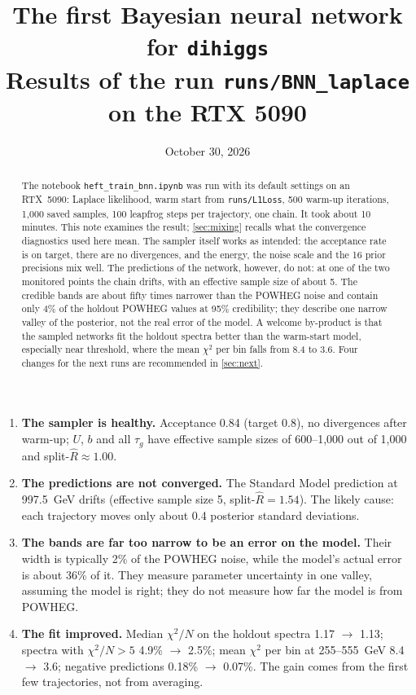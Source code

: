 \documentclass[11pt]{article}
\title{\textbf{The first Bayesian neural network for \texttt{dihiggs}}\\[4pt]
\large Results of the run \texttt{runs/BNN\_laplace} on the RTX 5090}
\date{October 30, 2026}
\newcommand{\file}[1]{\nolinkurl{#1}}
\begin{document}
\maketitle

\begin{abstract}
\noindent
The notebook \file{heft_train_bnn.ipynb} was run with its default settings on an
RTX~5090: Laplace likelihood, warm start from \file{runs/L1Loss}, 500 warm-up
iterations, 1,000 saved samples, 100 leapfrog steps per trajectory, one chain. It took
about 10 minutes. This note examines the result; \cref{sec:mixing} recalls what the convergence
diagnostics used here mean. The sampler itself works as intended:
the acceptance rate is on target, there are no divergences, and the energy, the noise
scale and the 16 prior precisions mix well. The predictions of the network, however,
do not: at one of the two monitored points the chain drifts, with an effective sample
size of about 5. The credible bands are about fifty times narrower than the POWHEG
noise and contain only 4\% of the holdout POWHEG values at 95\% credibility; they
describe one narrow valley of the posterior, not the real error of the model. A
welcome by-product is that the sampled networks fit the holdout spectra better than
the warm-start model, especially near threshold, where the mean $\chi^2$ per bin
falls from 8.4 to 3.6. Four changes for the next runs are recommended in
\cref{sec:next}.
\end{abstract}

\begin{keyidea}
\begin{enumerate}
  \item \textbf{The sampler is healthy.} Acceptance 0.84 (target 0.8), no divergences
    after warm-up; $U$, $b$ and all $\tau_g$ have effective sample sizes of 600--1,000
    out of 1,000 and split-$\hat R \approx 1.00$.
  \item \textbf{The predictions are not converged.} The Standard Model prediction at
    997.5~GeV drifts (effective sample size 5, split-$\hat R = 1.54$). The likely
    cause: each trajectory moves only about 0.4 posterior standard deviations.
  \item \textbf{The bands are far too narrow to be an error on the model.} Their width
    is typically 2\% of the POWHEG noise, while the model's actual error is about 36\%
    of it. They measure parameter uncertainty in one valley, assuming the model is
    right; they do not measure how far the model is from POWHEG.
  \item \textbf{The fit improved.} Median $\chi^2/N$ on the holdout spectra 1.17
    $\to$ 1.13; spectra with $\chi^2/N > 5$ 4.9\% $\to$ 2.5\%; mean $\chi^2$ per bin
    at 255--555~GeV 8.4 $\to$ 3.6; negative predictions 0.18\% $\to$ 0.07\%. The gain
    comes from the first few trajectories, not from averaging.
\end{enumerate}
\end{keyidea}
\end{document}
